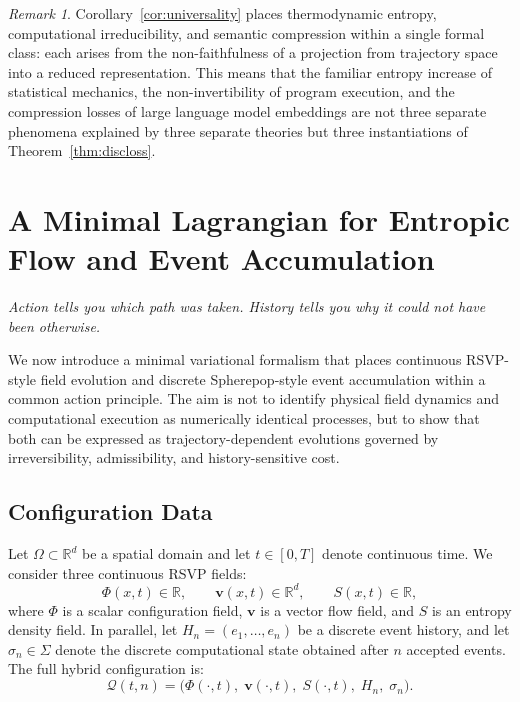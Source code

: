 \documentclass[12pt, twoside]{article}
\theoremstyle{plain}
\theoremstyle{definition}
\theoremstyle{remark}
\newtheorem{remark}[theorem]{Remark}
\begin{document}
\begin{remark}
Corollary~\ref{cor:universality} places thermodynamic entropy,
computational irreducibility, and semantic compression within
a single formal class:
each arises from the non-faithfulness of a projection from
trajectory space into a reduced representation.
This means that the familiar entropy increase of statistical
mechanics, the non-invertibility of program execution,
and the compression losses of large language model embeddings
are not three separate phenomena explained by three separate
theories but three instantiations of Theorem~\ref{thm:discloss}.
\end{remark}

\newpage

\section{A Minimal Lagrangian for Entropic Flow and Event Accumulation}
\label{sec:lagrangian}

\epigraph{\itshape
  Action tells you which path was taken.
  History tells you why it could not have been otherwise.}{}

We now introduce a minimal variational formalism that places
continuous RSVP-style field evolution and discrete Spherepop-style
event accumulation within a common action principle.
The aim is not to identify physical field dynamics and computational
execution as numerically identical processes, but to show that both
can be expressed as trajectory-dependent evolutions governed by
irreversibility, admissibility, and history-sensitive cost.

\subsection{Configuration Data}

Let $\Omega \subset \mathbb{R}^d$ be a spatial domain and
let $t \in [0,T]$ denote continuous time.
We consider three continuous RSVP fields:
\[
  \Phi(x,t) \in \mathbb{R}, \qquad
  \mathbf{v}(x,t) \in \mathbb{R}^d, \qquad
  S(x,t) \in \mathbb{R},
\]
where $\Phi$ is a scalar configuration field, $\mathbf{v}$ is a
vector flow field, and $S$ is an entropy density field.
In parallel, let $H_n = (e_1, \dots, e_n)$ be a discrete event
history, and let $\sigma_n \in \Sigma$ denote the discrete
computational state obtained after $n$ accepted events.
The full hybrid configuration is:
\[
  \mathcal{Q}(t,n)
  = \bigl(\Phi(\cdot,t),\; \mathbf{v}(\cdot,t),\;
          S(\cdot,t),\; H_n,\; \sigma_n \bigr).
\]
\end{document}
